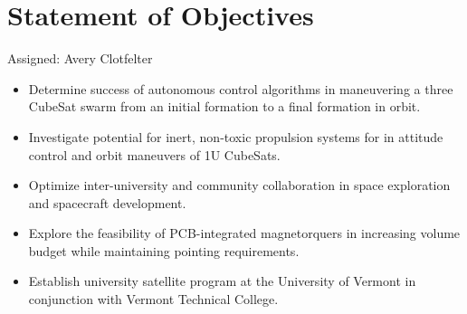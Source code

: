 \section{Statement of Objectives}
Assigned: Avery Clotfelter

\begin{itemize}
  \item Determine success of autonomous control algorithms in
    maneuvering a three CubeSat swarm from an initial formation to a
    final formation in orbit.
  \item Investigate potential for inert, non-toxic propulsion systems
    for in attitude control and orbit maneuvers of 1U CubeSats.
  \item Optimize inter-university and community collaboration in space
    exploration and spacecraft development.
  \item Explore the feasibility of PCB-integrated magnetorquers in
    increasing volume budget while maintaining pointing requirements.
  \item Establish university satellite program at the University of
    Vermont in conjunction with Vermont Technical College.
\end{itemize}
